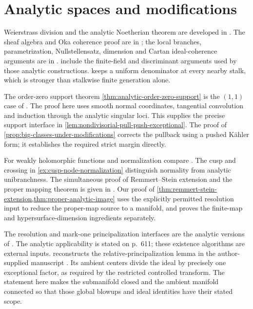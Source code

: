 \section{Analytic spaces and modifications}\label{sec:history-analytic-spaces}
Weierstrass division and the analytic Noetherian theorem are developed in \cite[Chapter II, (2.3)--(2.7), pp.~80--81]{DemBook}. The sheaf algebra and Oka coherence proof are in \cite[Chapter II, (3.8)--(3.22), pp.~87--90]{DemBook}; the local branches, parametrization, Nullstellensatz, dimension and Cartan ideal-coherence arguments are in \cite[Chapter II, (4.1)--(4.31), pp.~91--100]{DemBook}.  include the finite-field and discriminant arguments used by those analytic constructions.  keeps a uniform denominator at every nearby stalk, which is stronger than stalkwise finite generation alone.

The order-zero support theorem \cref{thm:analytic-order-zero-support} is the $(1,1)$ case of \cite[Chapter III, (2.10)--(2.14), pp.~141--143]{DemBook}. The proof here uses smooth normal coordinates, tangential convolution and induction through the analytic singular loci. This supplies the precise support interface in \cref{lem:nondivisorial-pull-push-exceptional}. The proof of \cref{prop:big-classes-under-modifications} corrects the pullback using a pushed K\"ahler form; it establishes the required strict margin directly.

For weakly holomorphic functions and normalization compare \cite[Chapter II, (7.1)--(7.15), pp.~110--116]{DemBook}. The cusp and crossing in \cref{ex:cusp-node-normalization} distinguish normality from analytic unibranchness. The simultaneous proof of Remmert--Stein extension and the proper mapping theorem is given in \cite[Chapter II, (8.7)--(8.8), pp.~118--121]{DemBook}. Our proof of \cref{thm:remmert-stein-extension,thm:proper-analytic-image} uses the explicitly permitted resolution input to reduce the proper-map source to a manifold, and proves the finite-map and hypersurface-dimension ingredients separately.

The resolution and mark-one principalization interfaces are the analytic versions of \cite[Theorems 1.1 and 1.3, pp.~611 and 614; Definitions 2.1--2.2, pp.~618--619]{BM08}. The analytic applicability is stated on p.~611; these existence algorithms are external inputs.  reconstructs the relative-principalization lemma in the author-supplied manuscript \cite[Lemma \texttt{relative-principalization}]{VuXiaNakamaye}. Its ambient centers divide the ideal by precisely one exceptional factor, as required by the restricted controlled transform. The statement here makes the submanifold closed and the ambient manifold connected so that those global blowups and ideal identities have their stated scope.

